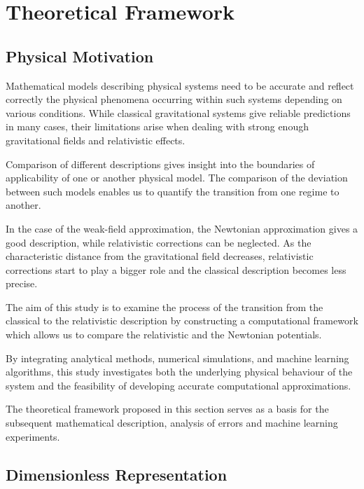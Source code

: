 \documentclass[
]{article}
\begin{document}
\section{Theoretical Framework}\label{theoretical-framework}

\subsection{Physical Motivation}\label{physical-motivation}

Mathematical models describing physical systems need to be accurate and
reflect correctly the physical phenomena occurring within such systems
depending on various conditions. While classical gravitational systems
give reliable predictions in many cases, their limitations arise when
dealing with strong enough gravitational fields and relativistic
effects.

Comparison of different descriptions gives insight into the boundaries
of applicability of one or another physical model. The comparison of the
deviation between such models enables us to quantify the transition from
one regime to another.

In the case of the weak-field approximation, the Newtonian approximation
gives a good description, while relativistic corrections can be
neglected. As the characteristic distance from the gravitational field
decreases, relativistic corrections start to play a bigger role and the
classical description becomes less precise.

The aim of this study is to examine the process of the transition from
the classical to the relativistic description by constructing a
computational framework which allows us to compare the relativistic and
the Newtonian potentials.

By integrating analytical methods, numerical simulations, and machine
learning algorithms, this study investigates both the underlying
physical behaviour of the system and the feasibility of developing
accurate computational approximations.

The theoretical framework proposed in this section serves as a basis for
the subsequent mathematical description, analysis of errors and machine
learning experiments.

\subsection{Dimensionless Representation}\label{dimensionless-representation}
\end{document}
